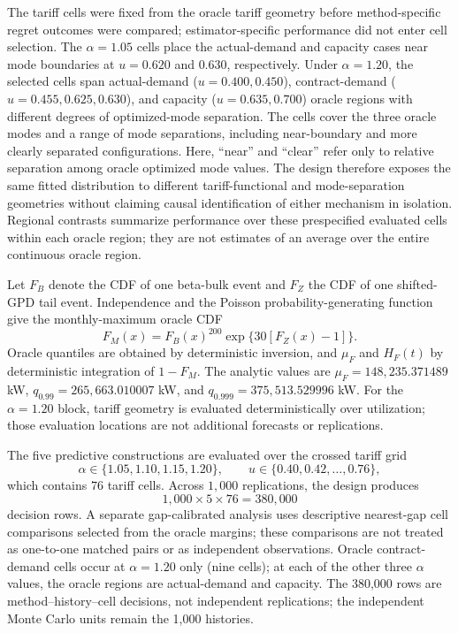 \documentclass[Times1COL]{WileyNJDv5}
\begin{document}
The tariff cells were fixed from the oracle tariff geometry before method-specific regret outcomes were compared; estimator-specific performance did not enter cell selection. The $\alpha=1.05$ cells place the actual-demand and capacity cases near mode boundaries at $u=0.620$ and $0.630$, respectively. Under $\alpha=1.20$, the selected cells span actual-demand ($u=0.400,0.450$), contract-demand ($u=0.455,0.625,0.630$), and capacity ($u=0.635,0.700$) oracle regions with different degrees of optimized-mode separation. The cells cover the three oracle modes and a range of mode separations, including near-boundary and more clearly separated configurations. Here, ``near'' and ``clear'' refer only to relative separation among oracle optimized mode values. The design therefore exposes the same fitted distribution to different tariff-functional and mode-separation geometries without claiming causal identification of either mechanism in isolation. Regional contrasts summarize performance over these prespecified evaluated cells within each oracle region; they are not estimates of an average over the entire continuous oracle region.

Let $F_B$ denote the CDF of one beta-bulk event and $F_Z$ the CDF of one shifted-GPD tail event. Independence and the Poisson probability-generating function give the monthly-maximum oracle CDF
\[
F_M(x)=F_B(x)^{200}\exp\{30[F_Z(x)-1]\}.
\]
Oracle quantiles are obtained by deterministic inversion, and $\mu_F$ and
$H_F(t)$ by deterministic integration of $1-F_M$. The analytic values are
$\mu_F=148{,}235.371489$ kW, $q_{0.99}=265{,}663.010007$ kW, and
$q_{0.999}=375{,}513.529996$ kW. For the $\alpha=1.20$ block, tariff
geometry is evaluated deterministically over utilization; those evaluation
locations are not additional forecasts or replications.

The five predictive constructions are evaluated over the crossed tariff
grid
\[
\alpha\in\{1.05,1.10,1.15,1.20\},
\qquad
u\in\{0.40,0.42,\ldots,0.76\},
\]
which contains $76$ tariff cells. Across $1{,}000$ replications, the design produces
\[
1{,}000\times5\times76
=
380{,}000
\]
decision rows. A separate gap-calibrated analysis uses descriptive
nearest-gap cell comparisons selected from the oracle margins; these
comparisons are not treated as one-to-one matched pairs or as
independent observations. Oracle contract-demand cells occur at
$\alpha=1.20$ only (nine cells); at each of the other three $\alpha$
values, the oracle regions are actual-demand and capacity. The 380,000
rows are method--history--cell decisions, not independent replications;
the independent Monte Carlo units remain the 1,000 histories.
\end{document}
